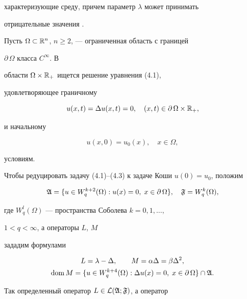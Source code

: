 характеризующие среду, причем параметр $\lambda$ может принимать 


отрицательные значения \cite{Sv7}. 


 


Пусть $\Omega\subset\Bbb R^n$, $n\ge 2$, --- ограниченная область с границей 


$\partial\,\Omega$ класса $C^\infty$. В 


области $\Omega\times\Bbb R_+$ ищется решение уравнения (4.1), 


удовлетворяющее граничному 


\begin{equation} 


u(x,t)=\Delta u(x,t)=0,\quad (x,t)\in\partial\,\Omega\times\Bbb R_+, 


\end{equation} 


и начальному 


\begin{equation} 


u(x,0)=u_0(x),\quad x\in \Omega, 


\end{equation} 


условиям. 


 


Чтобы редуцировать задачу (4.1)--(4.3) к задаче Коши $u(0)=u_0$, положим 


$$ 


\frak A=\{u\in W_q^{k+2}(\Omega):u(x)=0,\;x\in\partial\,\Omega\},\quad 


\frak F=W^k_q(\Omega), 


$$ 


где $W^l_q(\Omega)$ --- пространства Соболева $k=0,1,\dotsc,$ 


$1<q<\infty$, а операторы $L$, $M$


зададим формулами 


\begin{gather*} 


L=\lambda-\Delta,\qquad M=\alpha\Delta=\beta\Delta^2,\\ 


\dom M=\{u\in W_q^{k+4}(\Omega):\Delta u(x)=0,\;x\in\partial\,\Omega\} 


\cap \frak A. 


\end{gather*} 


Так определенный оператор $L\in\cal L(\frak A;\frak F)$, а оператор 


